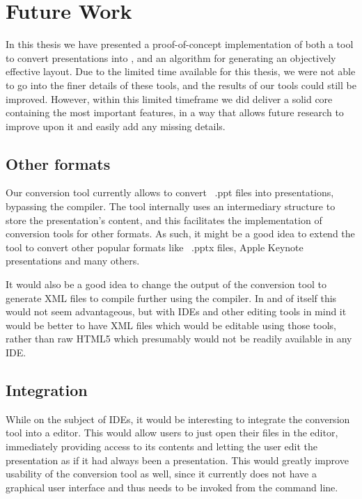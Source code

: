   \section{Future Work}
   \label{future}

   In this thesis we have presented a proof-of-concept implementation of both a
   tool to convert \ppt presentations into \mxp, and an algorithm for
   generating an objectively effective layout. Due to the limited time
   available for this thesis, we were not able to go into the finer details of
   these tools, and the results of our tools could still be improved. However, within this
   limited timeframe we did deliver a solid core containing the most important
   features, in a way that allows future research to improve upon it and easily
   add any missing details.

   \subsection{Other formats}

    Our conversion tool currently allows to convert \ppt\ .ppt files into \mxp
    presentations, bypassing the \mxp compiler. The tool internally uses an
    intermediary structure to store the presentation's content, and this
    facilitates the implementation of conversion tools for other formats. As
    such, it might be a good idea to extend the tool to convert other popular
    formats like \ppt\ .pptx files, Apple Keynote presentations and many others.

    It would also be a good idea to change the output of the conversion tool to
    generate \mxp XML files to compile further using the \mxp compiler. In and
    of itself this would not seem advantageous, but with \mxp IDEs and other
    editing tools in mind it would be better to have XML files which would be
    editable using those tools, rather than raw HTML5 which presumably would
    not be readily available in any IDE.

   \subsection{Integration}

    While on the subject of IDEs, it would be interesting to integrate the conversion
    tool into a \mxp editor. This would allow \mxp users to just open their
    \ppt files in the \mxp editor, immediately providing access to its contents
    and letting the user edit the presentation as if it had always been a \mxp
    presentation. This would greatly improve usability of the conversion tool
    as well, since it currently does not have a graphical user interface and
    thus needs to be invoked from the command line.

